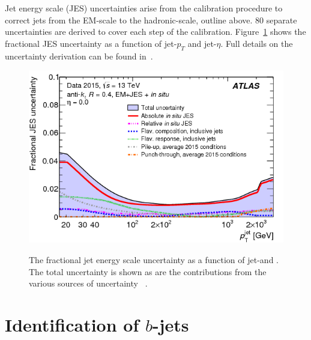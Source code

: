 Jet energy scale (JES) uncertainties arise from the calibration procedure
to correct jets from the EM-scale to the hadronic-scale, outline above.
80 separate uncertainties are derived to cover each step of the calibration.
Figure~\ref{fig:obj-jets_calib_JES} shows the fractional JES uncertainty as a function of jet-$p_T$ and jet-$\eta$.
Full details on the uncertainty derivation can be found in~\cite{obj-jets_calib_run2}.

\begin{figure}[!ht]
  \begin{center}
    \captionsetup[subfigure]{aboveskip=0pt,justification=centering}
     {\includegraphics[width=0.48\linewidth, angle=0]{figs/Objects/jets_uncert_JES_pt.png} }
  \end{center}
  \caption[The fractional jet energy scale uncertainty as a function of jet-\pT and \eta.
    The total uncertainty is shown as are the contributions from the various sources of uncertainty.]
          {The fractional jet energy scale uncertainty as a function of jet-\pT and \eta.
            The total uncertainty is shown as are the contributions from the various sources of uncertainty ~\cite{obj-jets_calib_run2}.}
  \label{fig:obj-jets_calib_JES}
\end{figure}

\FloatBarrier

\newpage
\section{Identification of $b$-jets}
\label{sec:obj-bjets}

